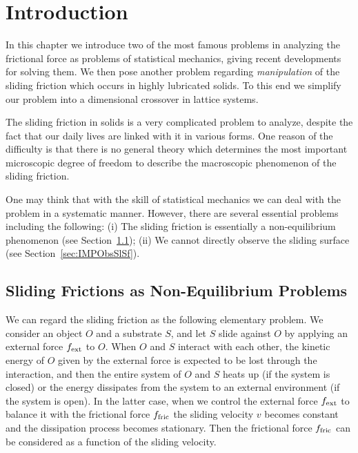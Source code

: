 \chapter{Introduction}
In this chapter we introduce two of the most famous problems in analyzing the frictional force as problems of statistical mechanics, giving recent developments for solving them. We then pose another problem regarding \textit{manipulation} of the sliding friction which occurs in highly lubricated solids. To this end we simplify our problem into a dimensional crossover in lattice systems.

The sliding friction in solids is a very complicated problem to analyze, despite the fact that our daily lives are linked with it in various forms. One reason of the difficulty is that there is no general theory which determines the most important microscopic degree of freedom to describe the macroscopic phenomenon of the sliding friction.

One may think that with the skill of statistical mechanics we can deal with the problem in a systematic manner. However, there are several essential problems including the following: (i) The sliding friction is essentially a non-equilibrium phenomenon (see Section~\ref{sec:NESliding}); (ii) We cannot directly observe the sliding surface (see Section~\ref{sec:IMPObsSlSf}).

\section{Sliding Frictions as Non-Equilibrium Problems}\label{sec:NESliding}
We can regard the sliding friction as the following elementary problem. We consider an object $O$ and a substrate $S$, and let $S$ slide against $O$ by applying an external force $f_{\rm ext}$ to $O$. When $O$ and $S$ interact with each other, the kinetic energy of $O$ given by the external force is expected to be lost through the interaction, and then the entire system of $O$ and $S$ heats up (if the system is closed) or the energy dissipates from the system to an external environment (if the system is open). In the latter case, when we control the external force $f_{\rm ext}$ to balance it with the frictional force $f_{\rm fric}$ the sliding velocity $v$ becomes constant and the dissipation process becomes stationary. Then the frictional force $f_{\rm fric}$ can be considered as a function of the sliding velocity.

